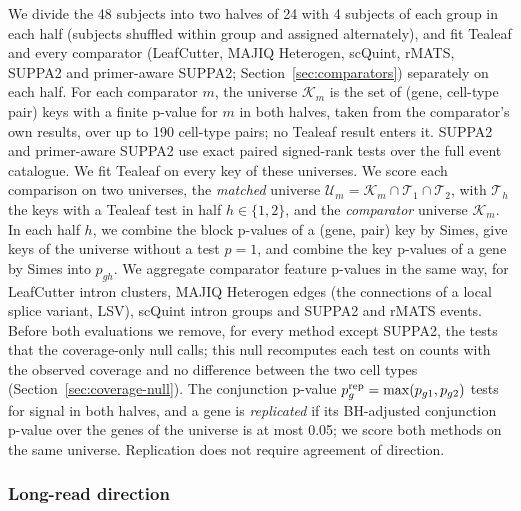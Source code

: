 \documentclass[11pt]{article}
\begin{document}
We divide the 48 subjects into two halves of 24 with 4 subjects of each group in each half (subjects shuffled within group and assigned alternately), and fit Tealeaf and every comparator (LeafCutter, MAJIQ Heterogen, scQuint, rMATS, SUPPA2 and primer-aware SUPPA2; Section~\ref{sec:comparators}) separately on each half. For each comparator $m$, the universe $\mathcal K_m$ is the set of (gene, cell-type pair) keys with a finite p-value for $m$ in both halves, taken from the comparator's own results, over up to 190 cell-type pairs; no Tealeaf result enters it. SUPPA2 and primer-aware SUPPA2 use exact paired signed-rank tests over the full event catalogue. We fit Tealeaf on every key of these universes. We score each comparison on two universes, the \emph{matched} universe $\mathcal U_m=\mathcal K_m\cap\mathcal T_1\cap\mathcal T_2$, with $\mathcal T_h$ the keys with a Tealeaf test in half $h\in\{1,2\}$, and the \emph{comparator} universe $\mathcal K_m$. In each half $h$, we combine the block p-values of a (gene, pair) key by Simes, give keys of the universe without a test $p=1$, and combine the key p-values of a gene by Simes into $p_{gh}$. We aggregate comparator feature p-values in the same way, for LeafCutter intron clusters, MAJIQ Heterogen edges (the connections of a local splice variant, LSV), scQuint intron groups and SUPPA2 and rMATS events. Before both evaluations we remove, for every method except SUPPA2, the tests that the coverage-only null calls; this null recomputes each test on counts with the observed coverage and no difference between the two cell types (Section~\ref{sec:coverage-null}). The conjunction p-value $p_g^{\rm rep}=\max(p_{g1},p_{g2})$ tests for signal in both halves, and a gene is \emph{replicated} if its BH-adjusted conjunction p-value over the genes of the universe is at most 0.05; we score both methods on the same universe. Replication does not require agreement of direction.

\subsubsection{Long-read direction}
\end{document}
